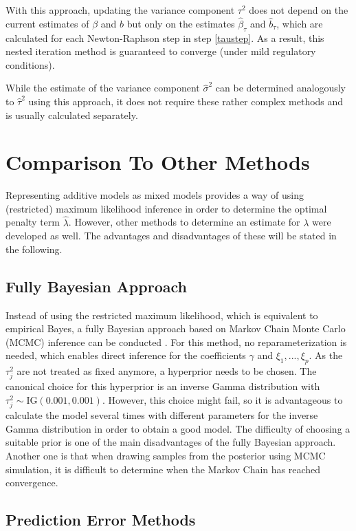 \documentclass[12pt]{article}
\begin{document}
With this approach, updating the variance component $\tau^2$ does not depend on the current estimates of $\beta$ and $b$ but only on the estimates $\hat{\beta}_{\tau}$ and $\hat{b}_\tau$, which are calculated for each Newton-Raphson step in step \ref{taustep}. As a result, this nested iteration method is guaranteed to converge (under mild regulatory conditions).

While the estimate of the variance component $\hat{\sigma}^2$ can be determined analogously to $\hat{\tau}^2$ using this approach, it does not require these rather complex methods and is usually calculated separately.

\section{Comparison To Other Methods} %

Representing additive models as mixed models provides a way of using (restricted) maximum likelihood inference in order to determine the optimal penalty term $\hat{\lambda}$. However, other methods to determine an estimate for $\lambda$ were developed as well. The advantages and disadvantages of these will be stated in the following.

\subsection{Fully Bayesian Approach}

Instead of using the restricted maximum likelihood, which is equivalent to empirical Bayes, a fully Bayesian approach based on Markov Chain Monte Carlo (MCMC) inference can be conducted \cite{kneib2006mixed}. For this method, no reparameterization is needed, which enables direct inference for the coefficients $\gamma$ and $\xi_1,...,\xi_p$. 
As the $\tau_j^2$ are not treated as fixed anymore, a hyperprior needs to be chosen. The canonical choice for this hyperprior is an inverse Gamma distribution with $\tau^2_j \sim \text{IG}(0.001,0.001)$. However, this choice might fail, so it is advantageous to calculate the model several times with different parameters for the inverse Gamma distribution in order to obtain a good model. The difficulty of choosing a suitable prior is one of the main disadvantages of the fully Bayesian approach. Another one is that when drawing samples from the posterior using MCMC simulation, it is difficult to determine when the Markov Chain has reached convergence.


\subsection{Prediction Error Methods}
\end{document}
